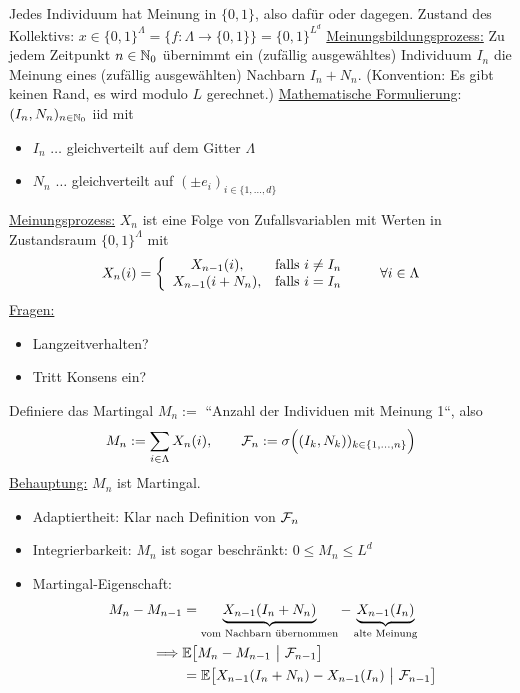\begin{beisp}[Wählermodell]
Jedes Individuum hat Meinung in $\lbrace0,1\rbrace$, also dafür oder dagegen. Zustand des Kollektivs:
$x\in\lbrace0,1\rbrace^{\Lambda}=\big\lbrace f:\Lambda\to\lbrace 0,1\rbrace\big\rbrace=\lbrace0,1\rbrace^{L^d}$\nl
\ul{Meinungsbildungsprozess:} Zu jedem Zeitpunkt $n\in\mathbb{N}_0$ übernimmt ein (zufällig ausgewähltes) Individuum $I_n$ die Meinung eines (zufällig ausgewählten) Nachbarn $I_n+N_n$. (Konvention: Es gibt keinen Rand, es wird modulo $L$ gerechnet.)\nl
\ul{Mathematische Formulierung}: $(I_n,N_n)_{n\in\mathbb{N}_0}$ iid mit 
\begin{itemize}
\item $I_n$ $\ldots$ gleichverteilt auf dem Gitter $\Lambda$
\item $N_n$ $\ldots$ gleichverteilt auf $(\pm e_i)_{i\in\lbrace1,\ldots,d\rbrace}$
\end{itemize}
\ul{Meinungsprozess:} $X_n$ ist eine Folge von Zufallsvariablen mit Werten in Zustandsraum $\lbrace0,1\rbrace^\Lambda$ mit
\begin{align*}
X_n(i)=\left\lbrace\begin{array}{cl}
X_{n-1}(i), &\text{falls } i\neq I_n\\
X_{n-1}(i+N_n),&\text{falls } i=I_n
\end{array}\right.\qquad\forall i\in\Lambda
\end{align*}
\ul{Fragen:}
\begin{itemize}
	\item Langzeitverhalten?
	\item Tritt Konsens ein?
\end{itemize}
Definiere das Martingal $M_n:=$ ``Anzahl der Individuen mit Meinung 1``, also
\begin{align*}
M_n:=\sum\limits_{i\in\Lambda} X_n(i),\qquad \mathcal{F}_n:=\sigma\Big((I_k,N_k))_{k\in\lbrace1,\ldots,n\rbrace}\Big)
\end{align*}
\ul{Behauptung:} $M_n$ ist Martingal.
\begin{itemize}
\item Adaptiertheit: Klar nach Definition von $\mathcal{F}_n$
\item Integrierbarkeit: $M_n$ ist sogar beschränkt: $0\leq M_n\leq L^d$
\item Martingal-Eigenschaft:
\begin{align*}
M_n-M_{n-1}
&=\underbrace{X_{n-1}(I_n+N_n)}_{\text{vom Nachbarn übernommen}}-\underbrace{X_{n-1}(I_n)}_{\text{alte Meinung}}\\
\implies&\E\big[M_n-M_{n-1}~\big|~\F_{n-1}\big]\\
&=\E\big[X_{n-1}(I_n+N_n)-X_{n-1}(I_n)~\big|~\F_{n-1}\big]\\

\end{align*}
\end{itemize}
\end{beisp}
